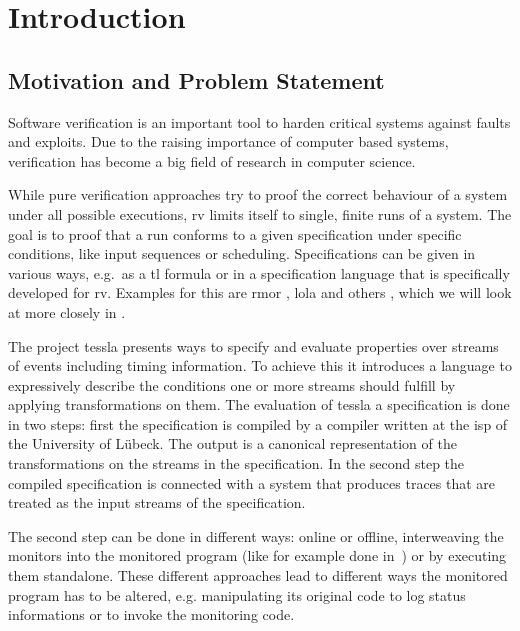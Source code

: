 %
\chapter{Introduction}
\label{sec:intro}


\section{Motivation and Problem Statement}
\label{sec:intro:motivation}

Software verification is an important tool to harden critical systems against faults and exploits.
Due to the raising importance of computer based systems, verification has become a big field of research in computer science.

While pure verification approaches try to proof the correct behaviour of a system under all possible executions, \gls{rv} limits itself to single, finite runs of a system.
The goal is to proof that a run conforms to a given specification under specific conditions, like input sequences or scheduling.
Specifications can be given in various ways, e.g.\ as a \gls{tl} formula or in a specification language that is specifically developed for \gls{rv}.
Examples for this are \gls{rmor} \citep{Havelund2008}, \gls{lola} \citep{DAngelo2005} and others \citep{Zheng2015, Pike2010, Mostafa2015}, which we will look at more closely in .

The project \Gls{tessla}\citep{Decker2016} presents ways to specify and evaluate properties over streams of events including timing information.
To achieve this it introduces a language to expressively describe the conditions one or more streams should fulfill by applying transformations on them.
The evaluation of \gls{tessla} a specification is done in two steps: first the specification is compiled by a compiler written at the \gls{isp} of the University of Lübeck.
The output is a canonical representation of the transformations on the streams in the specification.
In the second step the compiled specification is connected with a system that produces traces that are treated as the input streams of the specification.

The second step can be done in different ways: online or offline, interweaving the monitors into the monitored program (like for example done in~\cite{Havelund2008}) or by executing them standalone.
These different approaches lead to different ways the monitored program has to be altered, e.g. manipulating its original code to log status informations or to invoke the monitoring code.

